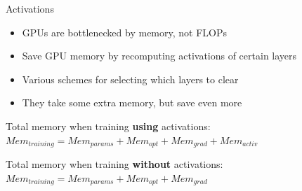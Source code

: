 
\begin{vbframe}{Activations}

\vfill

\begin{itemize}
 	\item GPUs are bottlenecked by memory, not FLOPs
 	\item Save GPU memory by recomputing activations of certain layers
	\item Various schemes for selecting which layers to clear
	\item They take some extra memory, but save even more
\end{itemize}

\vskip5mm

Total memory when training \textbf{using} activations: \newline
$Mem_{training} = Mem_{params} + Mem_{opt} + Mem_{grad} + Mem_{activ}$

\vskip5mm

Total memory when training \textbf{without} activations: \newline
$Mem_{training} = Mem_{params} + Mem_{opt} + Mem_{grad}$

\vskip5mm


\vfill

\end{vbframe}


\endlecture
